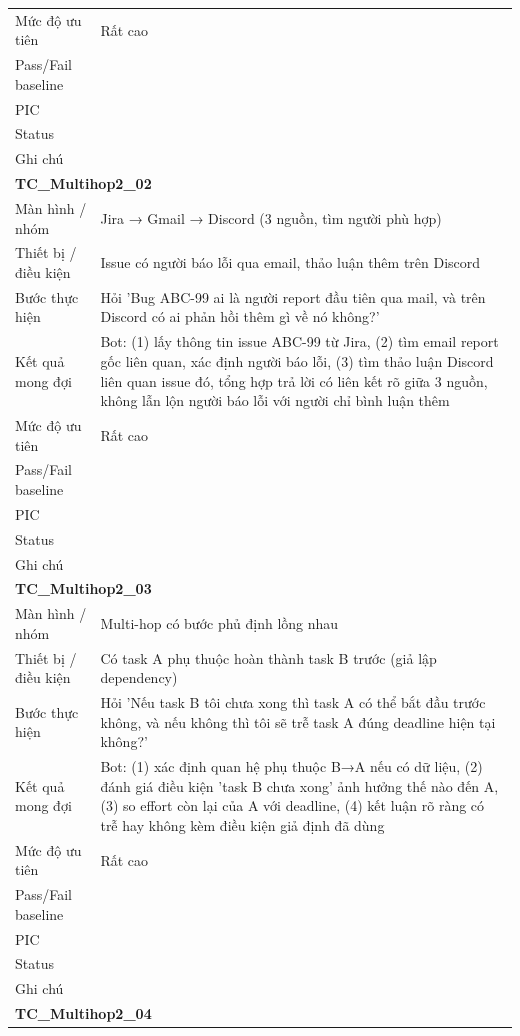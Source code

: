 \documentclass[12pt,a4paper]{article}
\begin{document}
\begin{longtable}{p{3.0cm}p{11.5cm}}
Mức độ ưu tiên & Rất cao \\
Pass/Fail baseline &  \\
PIC &  \\
Status &  \\
Ghi chú &  \\
\midrule
\multicolumn{2}{l}{\textbf{TC\_Multihop2\_02}} \\
Màn hình / nhóm & Jira → Gmail → Discord (3 nguồn, tìm người phù hợp) \\
Thiết bị / điều kiện & Issue có người báo lỗi qua email, thảo luận thêm trên Discord \\
Bước thực hiện & Hỏi 'Bug ABC-99 ai là người report đầu tiên qua mail, và trên Discord có ai phản hồi thêm gì về nó không?' \\
Kết quả mong đợi & Bot: (1) lấy thông tin issue ABC-99 từ Jira, (2) tìm email report gốc liên quan, xác định người báo lỗi, (3) tìm thảo luận Discord liên quan issue đó, tổng hợp trả lời có liên kết rõ giữa 3 nguồn, không lẫn lộn người báo lỗi với người chỉ bình luận thêm \\
Mức độ ưu tiên & Rất cao \\
Pass/Fail baseline &  \\
PIC &  \\
Status &  \\
Ghi chú &  \\
\midrule
\multicolumn{2}{l}{\textbf{TC\_Multihop2\_03}} \\
Màn hình / nhóm & Multi-hop có bước phủ định lồng nhau \\
Thiết bị / điều kiện & Có task A phụ thuộc hoàn thành task B trước (giả lập dependency) \\
Bước thực hiện & Hỏi 'Nếu task B tôi chưa xong thì task A có thể bắt đầu trước không, và nếu không thì tôi sẽ trễ task A đúng deadline hiện tại không?' \\
Kết quả mong đợi & Bot: (1) xác định quan hệ phụ thuộc B→A nếu có dữ liệu, (2) đánh giá điều kiện 'task B chưa xong' ảnh hưởng thế nào đến A, (3) so effort còn lại của A với deadline, (4) kết luận rõ ràng có trễ hay không kèm điều kiện giả định đã dùng \\
Mức độ ưu tiên & Rất cao \\
Pass/Fail baseline &  \\
PIC &  \\
Status &  \\
Ghi chú &  \\
\midrule
\multicolumn{2}{l}{\textbf{TC\_Multihop2\_04}} \\

\end{longtable}
\end{document}
